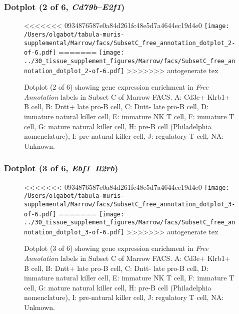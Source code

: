 \subsubsection{Dotplot (2 of 6, \emph{Cd79b}--\emph{E2f1})}
\begin{figure}[h]
\centering
<<<<<<< 0934876587e0a84d261fc48e5d7a4644ec19d4e0
\texttt{[image: /Users/olgabot/tabula-muris-supplemental/Marrow/facs/SubsetC\_free\_annotation\_dotplot\_2-of-6.pdf]}
=======
\texttt{[image: ../30\_tissue\_supplement\_figures/Marrow/facs/SubsetC\_free\_annotation\_dotplot\_2-of-6.pdf]}
>>>>>>> autogenerate tex

\caption{ Dotplot (2 of 6)  showing gene expression enrichment in \emph{Free Annotation} labels in Subset C of Marrow FACS. A: Cd3e+ Klrb1+ B cell, B: Dntt+ late pro-B cell, C: Dntt- late pro-B cell, D: immature natural killer cell, E: immature NK T cell, F: immature T cell, G: mature natural killer cell, H: pre-B cell (Philadelphia nomenclature), I: pre-natural killer cell, J: regulatory T cell, NA: Unknown.}
\end{figure}


\clearpage

\subsubsection{Dotplot (3 of 6, \emph{Ebf1}--\emph{Il2rb})}
\begin{figure}[h]
\centering
<<<<<<< 0934876587e0a84d261fc48e5d7a4644ec19d4e0
\texttt{[image: /Users/olgabot/tabula-muris-supplemental/Marrow/facs/SubsetC\_free\_annotation\_dotplot\_3-of-6.pdf]}
=======
\texttt{[image: ../30\_tissue\_supplement\_figures/Marrow/facs/SubsetC\_free\_annotation\_dotplot\_3-of-6.pdf]}
>>>>>>> autogenerate tex

\caption{ Dotplot (3 of 6)  showing gene expression enrichment in \emph{Free Annotation} labels in Subset C of Marrow FACS. A: Cd3e+ Klrb1+ B cell, B: Dntt+ late pro-B cell, C: Dntt- late pro-B cell, D: immature natural killer cell, E: immature NK T cell, F: immature T cell, G: mature natural killer cell, H: pre-B cell (Philadelphia nomenclature), I: pre-natural killer cell, J: regulatory T cell, NA: Unknown.}
\end{figure}


\clearpage

